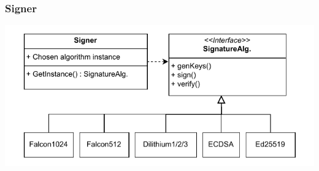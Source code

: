 \begin{frame}
    \frametitle{Signer}
    \centering
    \includegraphics[width=\textwidth]{img/my-signer-ex.pdf}
\end{frame}







